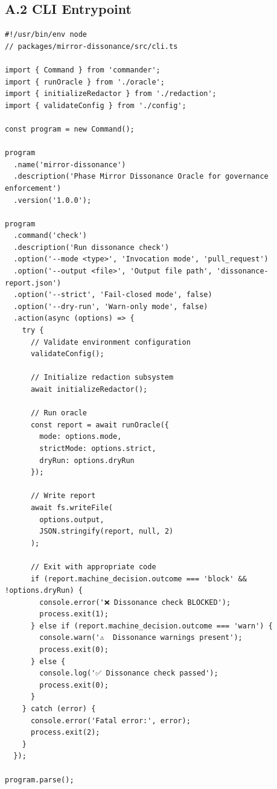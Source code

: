 \documentclass[11pt,a4paper]{article}
\begin{document}
\subsection*{A.2 CLI Entrypoint}

\begin{verbatim}
#!/usr/bin/env node
// packages/mirror-dissonance/src/cli.ts

import { Command } from 'commander';
import { runOracle } from './oracle';
import { initializeRedactor } from './redaction';
import { validateConfig } from './config';

const program = new Command();

program
  .name('mirror-dissonance')
  .description('Phase Mirror Dissonance Oracle for governance enforcement')
  .version('1.0.0');

program
  .command('check')
  .description('Run dissonance check')
  .option('--mode <type>', 'Invocation mode', 'pull_request')
  .option('--output <file>', 'Output file path', 'dissonance-report.json')
  .option('--strict', 'Fail-closed mode', false)
  .option('--dry-run', 'Warn-only mode', false)
  .action(async (options) => {
    try {
      // Validate environment configuration
      validateConfig();
      
      // Initialize redaction subsystem
      await initializeRedactor();
      
      // Run oracle
      const report = await runOracle({
        mode: options.mode,
        strictMode: options.strict,
        dryRun: options.dryRun
      });
      
      // Write report
      await fs.writeFile(
        options.output,
        JSON.stringify(report, null, 2)
      );
      
      // Exit with appropriate code
      if (report.machine_decision.outcome === 'block' && !options.dryRun) {
        console.error('❌ Dissonance check BLOCKED');
        process.exit(1);
      } else if (report.machine_decision.outcome === 'warn') {
        console.warn('⚠️  Dissonance warnings present');
        process.exit(0);
      } else {
        console.log('✅ Dissonance check passed');
        process.exit(0);
      }
    } catch (error) {
      console.error('Fatal error:', error);
      process.exit(2);
    }
  });

program.parse();
\end{verbatim}
\end{document}
